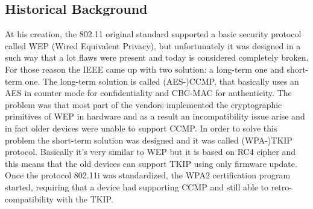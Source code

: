 \subsection{Historical Background}
At his creation, the 802.11 original standard supported a basic security protocol called WEP (Wired Equivalent Privacy), but unfortunately it was designed in a such way that a lot flaws
were present and today is considered completely broken. For those reason the IEEE came up with two solution: a long-term one and short-term one. 
The long-term solution is called (AES-)CCMP, that basically uses an AES in counter mode for confidentiality and CBC-MAC for authenticity. The problem was that most part of the vendors
implemented the cryptographic primitives of WEP in hardware and as a result an incompatibility issue arise and in fact older devices were unable to support CCMP.
In order to solve this problem the short-term solution was designed and it was called (WPA-)TKIP protocol. Basically it's very similar to WEP but it is based on RC4 cipher and this means that
the old devices can support TKIP using only firmware update.
Once the protocol 802.11i was standardized, the WPA2 certification program started, requiring that a device had supporting CCMP and still able to retro-compatibility with the TKIP.

